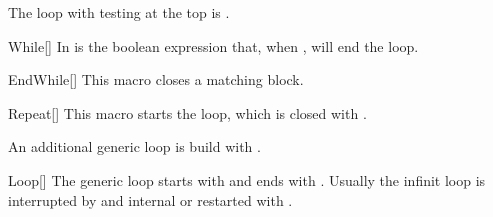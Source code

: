 \documentclass[a4paper, 11pt]{article}
\begin{document}
\begin{tcblisting}{}
    \begin{algorithmic}
        \EndFor
        \EndFor
        \EndFor
    \end{algorithmic}
\end{tcblisting}

The loop with testing at the top is .

\begin{macro}{While}[]
    In  is the boolean expression that, when \False, will end the loop.

    \BlockOptions
\end{macro}


\begin{macro}{EndWhile}[]
    This macro closes a matching  block.

    \StatementOptions
\end{macro}

\begin{tcblisting}{}
    \begin{algorithmic}
        \EndWhile
    \end{algorithmic}
\end{tcblisting}

\begin{macro}{Repeat}[]
    This macro starts the  loop, which is closed with .

    \BlockOptions
\end{macro}

\begin{tcblisting}{}
    \begin{algorithmic}
        \Repeat
    \end{algorithmic}
\end{tcblisting}


An additional generic loop is build with .

\begin{macro}{Loop}[]
    The generic loop starts with  and ends with . Usually the infinit loop is interrupted by and internal  or restarted with .

    \BlockOptions
\end{macro}
\end{document}
